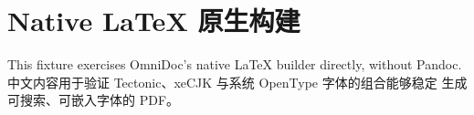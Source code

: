 \section{Native LaTeX 原生构建}

This fixture exercises OmniDoc's native \LaTeX{} builder directly, without
Pandoc. 中文内容用于验证 Tectonic、xeCJK 与系统 OpenType 字体的组合能够稳定
生成可搜索、可嵌入字体的 PDF。
